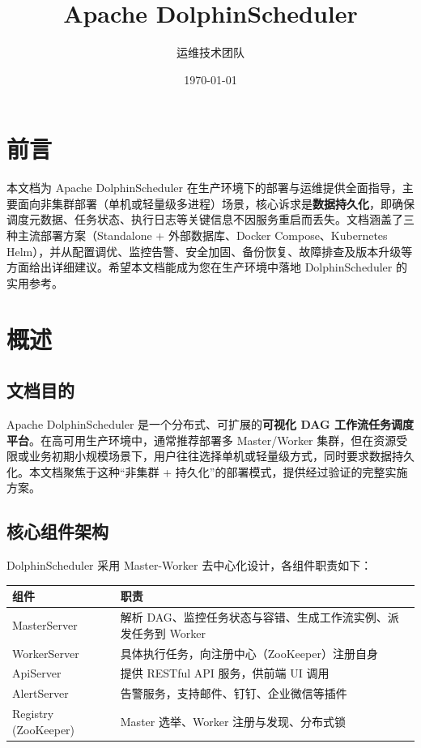 \documentclass[UTF8, a4paper]{ctexbook}
\title{Apache DolphinScheduler}
\author{运维技术团队}
\date{\today}
\begin{document}
	
\maketitle
\thispagestyle{empty}
\newpage
	
\tableofcontents
\thispagestyle{empty}
\newpage
	
\setcounter{page}{1}
	
\chapter{前言}
	
本文档为 Apache DolphinScheduler 在生产环境下的部署与运维提供全面指导，主要面向非集群部署（单机或轻量级多进程）场景，核心诉求是\textbf{数据持久化}，即确保调度元数据、任务状态、执行日志等关键信息不因服务重启而丢失。文档涵盖了三种主流部署方案（Standalone + 外部数据库、Docker Compose、Kubernetes Helm），并从配置调优、监控告警、安全加固、备份恢复、故障排查及版本升级等方面给出详细建议。希望本文档能成为您在生产环境中落地 DolphinScheduler 的实用参考。
	
\chapter{概述}
	
\section{文档目的}
	
Apache DolphinScheduler 是一个分布式、可扩展的\textbf{可视化 DAG 工作流任务调度平台}。在高可用生产环境中，通常推荐部署多 Master/Worker 集群，但在资源受限或业务初期小规模场景下，用户往往选择单机或轻量级方式，同时要求数据持久化。本文档聚焦于这种“非集群 + 持久化”的部署模式，提供经过验证的完整实施方案。
	
\section{核心组件架构}
	
DolphinScheduler 采用 Master-Worker 去中心化设计，各组件职责如下：
	
\begin{longtable}{p{3cm}p{10cm}}
	\toprule
	\textbf{组件} & \textbf{职责} \\
	\midrule
	MasterServer & 解析 DAG、监控任务状态与容错、生成工作流实例、派发任务到 Worker \\
	WorkerServer & 具体执行任务，向注册中心（ZooKeeper）注册自身 \\
	ApiServer  & 提供 RESTful API 服务，供前端 UI 调用 \\
	AlertServer & 告警服务，支持邮件、钉钉、企业微信等插件 \\
	Registry (ZooKeeper) & Master 选举、Worker 注册与发现、分布式锁 \\
	\bottomrule
\end{longtable}
	
\end{document}
